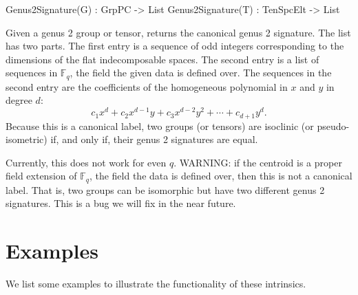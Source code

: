 \documentclass{documentation}
\begin{document}
\begin{intrinsics}
Genus2Signature(G) : GrpPC -> List
Genus2Signature(T) : TenSpcElt -> List
\end{intrinsics}

Given a genus 2 group or tensor, returns the canonical genus 2 signature. 
The list has two parts.
The first entry is a sequence of odd integers corresponding to the dimensions of the flat indecomposable spaces.
The second entry is a list of sequences in $\mathbb{F}_q$, the field the given data is defined over.
The sequences in  the second entry are the coefficients of the homogeneous polynomial in $x$ and $y$ in degree $d$:
\[ c_1x^d + c_2 x^{d-1}y + c_3 x^{d-2}y^2 + \cdots + c_{d+1}y^d. \]
Because this is a canonical label, two groups (or tensors) are isoclinic (or pseudo-isometric) if, and only if, their genus 2 signatures are equal. 

Currently, this does not work for even $q$. 
WARNING: if the centroid is a proper field extension of $\mathbb{F}_q$, the field the data is defined over, then this is not a canonical label. 
That is, two groups can be isomorphic but have two different genus 2 signatures. 
This is a bug we will fix in the near future.

\section{Examples}
We list some examples to illustrate the functionality of these intrinsics.
\end{document}
